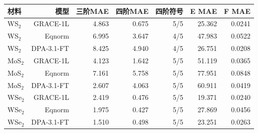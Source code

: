 \begin{tabular}{lrrrrrr}
\toprule
材料 & 模型 & 三阶MAE & 四阶MAE & 四阶符号 & E MAE & F MAE \\
\midrule
WS$_2$ & GRACE-1L & 4.863 & 0.675 & 5/5 & 25.362 & 0.0241 \\
WS$_2$ & Eqnorm & 6.995 & 3.647 & 4/5 & 47.983 & 0.0522 \\
WS$_2$ & DPA-3.1-FT & 8.425 & 4.940 & 4/5 & 26.751 & 0.0208 \\
MoS$_2$ & GRACE-1L & 4.123 & 1.642 & 5/5 & 51.119 & 0.0365 \\
MoS$_2$ & Eqnorm & 7.161 & 5.758 & 5/5 & 77.951 & 0.0848 \\
MoS$_2$ & DPA-3.1-FT & 2.607 & 4.063 & 5/5 & 60.911 & 0.0419 \\
WSe$_2$ & GRACE-1L & 2.419 & 0.476 & 5/5 & 19.371 & 0.0240 \\
WSe$_2$ & Eqnorm & 1.975 & 0.427 & 5/5 & 27.869 & 0.0456 \\
WSe$_2$ & DPA-3.1-FT & 1.510 & 0.498 & 5/5 & 23.251 & 0.0263 \\
\bottomrule
\end{tabular}
